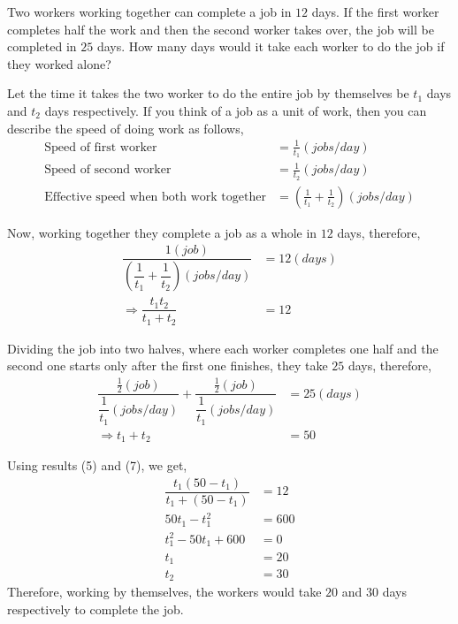 

\question[4] Two workers working together can complete a job in $12$ days. If the first worker completes half the work and then the second worker takes over, the job will be completed in $25$ days. How many days would it take each worker to do the job if they worked alone?


\ifprintanswers
\fi 

\begin{solution}[\fullpage]
  Let the time it takes the two worker to do the entire job by themselves be $t_1$ days and $t_2$ days respectively. If you think of a job as a unit of work, then you can describe the speed of doing work as follows,
  \begin{align}
    \text{Speed of first worker}  &= \frac{1}{t_1}(jobs/day) \\
    \text{Speed of second worker} &= \frac{1}{t_2}(jobs/day) \\
    \text{Effective speed when both work together}     
    				  &= \left(\frac{1}{t_1}+\frac{1}{t_2}\right)(jobs/day)
  \end{align}
  
  Now, working together they complete a job as a whole in $12$ days, therefore,
  \begin{align}
	\dfrac{1(job)}
	      {\left(\dfrac{1}{t_1}+\dfrac{1}{t_2}\right)(jobs/day)} &= 12(days) \\
	\Rightarrow \dfrac{t_1t_2}{t_1+t_2}                          &= 12
  \end{align}
  
  Dividing the job into two halves, where each worker completes one half and the second one starts only after the first one finishes, they take $25$ days, therefore,
  \begin{align}
    \dfrac{\frac{1}{2}(job)}{\dfrac{1}{t_1}(jobs/day)}+
    	\dfrac{\frac{1}{2}(job)}{\dfrac{1}{t_1}(jobs/day)} &= 25(days) \\
    \Rightarrow t_1+t_2                                    &= 50
  \end{align}
  
  Using results (5) and (7), we get,
  \begin{align}
    \dfrac{t_1(50-t_1)}{t_1+(50-t_1)} &= 12 \\
    50t_1-t_1^2                       &= 600 \\
    t_1^2-50t_1+600                   &= 0 \\     
    t_1                               &= 20 \\
    t_2                               &= 30
  \end{align}
  Therefore, working by themselves, the workers would take $20$ and $30$ days respectively to complete the job.

\end{solution}

